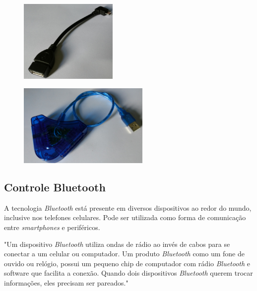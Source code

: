 \begin{figure}[H]
	
	\begin{minipage}{.5\textwidth}{
			\centering
			\includegraphics[height=4cm]{Imagens/otg.jpg}		
			\label{f.otg}	
		}
	\end{minipage}
	\begin{minipage}{.5\textwidth}{
			\centering
			\includegraphics[height=4cm]{Imagens/adaptador.jpg}		
			\label{f.adaptador}
		}
	\end{minipage}
	
\end{figure}

\subsection{Controle Bluetooth}

A tecnologia \textit{Bluetooth} está presente em diversos dispositivos ao redor do mundo, inclusive nos telefones celulares. Pode ser utilizada como forma de comunicação entre \textit{smartphones} e periféricos.

\begin{citacao}
	"Um dispositivo \textit{Bluetooth} utiliza ondas de rádio ao invés de cabos para se conectar a um celular ou computador. Um produto \textit{Bluetooth} como um fone de ouvido ou relógio, possui um pequeno chip de computador com rádio \textit{Bluetooth} e software que facilita a conexão. Quando dois dispositivos \textit{Bluetooth} querem trocar informações, eles precisam ser pareados." \cite[tradução nossa]{bluetooth}
\end{citacao}

